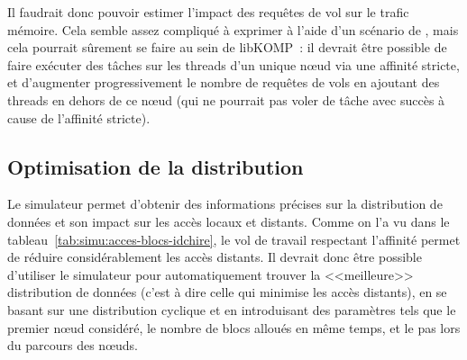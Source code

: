Il faudrait donc pouvoir estimer l'impact des requêtes de vol sur le trafic mémoire.
Cela semble assez compliqué à exprimer à l'aide d'un scénario de \outil, mais cela pourrait sûrement se faire au sein de libKOMP~: il devrait être possible de faire exécuter des tâches sur les threads d'un unique nœud via une affinité stricte, et d'augmenter progressivement le nombre de requêtes de vols en ajoutant des threads en dehors de ce nœud (qui ne pourrait pas voler de tâche avec succès à cause de l'affinité stricte).


\subsection{Optimisation de la distribution}

Le simulateur permet d'obtenir des informations précises sur la distribution de données et son impact sur les accès locaux et distants.
Comme on l'a vu dans le tableau~\ref{tab:simu:acces-blocs-idchire}, le vol de travail respectant l'affinité permet de réduire considérablement les accès distants.
Il devrait donc être possible d'utiliser le simulateur pour automatiquement trouver la <<meilleure>> distribution de données (c'est à dire celle qui minimise les accès distants), en se basant sur une distribution cyclique et en introduisant des paramètres tels que le premier nœud considéré, le nombre de blocs alloués en même temps, et le pas lors du parcours des nœuds.
